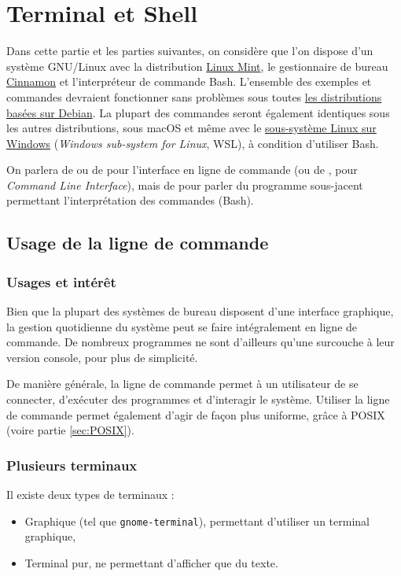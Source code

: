 \section{Terminal et Shell}
Dans cette partie et les parties suivantes, on considère que l'on dispose d'un système GNU/Linux avec la distribution \href{https://linuxmint.com}{Linux Mint}, le gestionnaire de bureau \href{https://github.com/linuxmint/Cinnamon}{Cinnamon} et l'interpréteur de commande Bash. L'ensemble des exemples et commandes devraient fonctionner sans problèmes sous toutes \href{https://www.debian.org/derivatives/index.fr.html}{les distributions basées sur Debian}. La plupart des commandes seront également identiques sous les autres distributions, sous macOS et même avec le \href{https://docs.microsoft.com/fr-fr/windows/wsl/install-win10}{sous-système Linux sur Windows} (\textit{Windows sub-system for Linux}, WSL), à condition d'utiliser Bash.

 On parlera de  ou de  pour l'interface en ligne de commande (ou de , pour \textit{Command Line Interface}), mais de  pour parler du programme sous-jacent permettant l'interprétation des commandes (Bash).

\subsection{Usage de la ligne de commande}

\subsubsection{Usages et intérêt}

Bien que la plupart des systèmes de bureau disposent d'une interface graphique, la gestion quotidienne du système peut se faire intégralement en ligne de commande. De nombreux programmes ne sont d'ailleurs qu'une surcouche à leur version console, pour plus de simplicité.

De manière générale, la ligne de commande permet à un utilisateur de se connecter, d'exécuter des programmes et d'interagir le système. Utiliser la ligne de commande permet également d'agir de façon plus uniforme, grâce à POSIX (voire partie \ref{sec:POSIX}).

\subsubsection{Plusieurs terminaux}
Il existe deux types de terminaux : 
\begin{itemize}
    \item Graphique (tel que \texttt{gnome-terminal}), permettant d'utiliser un terminal graphique,
    \item Terminal pur, ne permettant d'afficher que du texte.
\end{itemize}
\vspace{\baselineskip}

